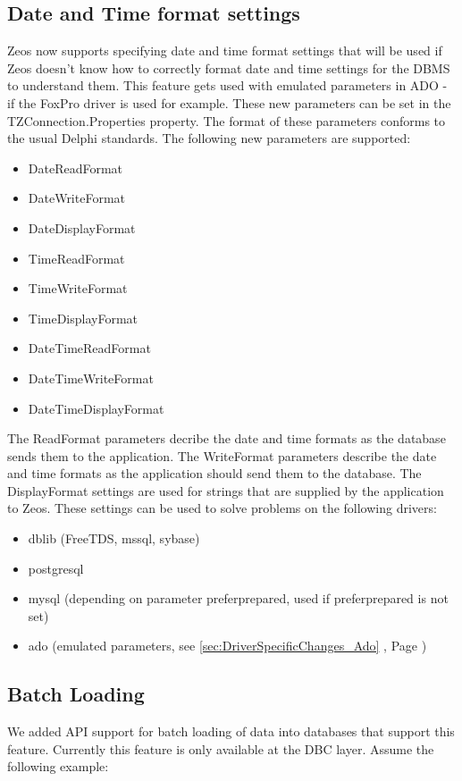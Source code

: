 \documentclass[a4paper,12pt,oneside]{article}
\begin{document}
\subsection{Date and Time format settings}
\label{sec:GeneralChanges_DateAndTimeFormatSettings}
Zeos now supports specifying date and time format settings that will be used if Zeos doesn't know how to correctly format date and time settings for the DBMS to understand them.
This feature gets used with emulated parameters in ADO - if the FoxPro driver is used for example.
These new parameters can be set in the TZConnection.Properties property.
The format of these parameters conforms to the usual Delphi standards.
The following new parameters are supported:
\begin{itemize}
\item DateReadFormat
\item DateWriteFormat
\item DateDisplayFormat
\item TimeReadFormat
\item TimeWriteFormat
\item TimeDisplayFormat
\item DateTimeReadFormat
\item DateTimeWriteFormat
\item DateTimeDisplayFormat
\end{itemize}
The ReadFormat parameters decribe the date and time formats as the data\-base sends them to the application.
The WriteFormat parameters describe the date and time formats as the application should send them to the database.
The DisplayFormat settings are used for strings that are supplied by the application to Zeos.
These settings can be used to solve problems on the following drivers:
\begin{itemize}
\item dblib (FreeTDS, mssql, sybase)
\item postgresql
\item mysql (depending on parameter preferprepared, used if preferprepared is not set)
\item ado (emulated parameters, see \ref{sec:DriverSpecificChanges_Ado} , Page \pageref{sec:DriverSpecificChanges_Ado})
\end{itemize}

\subsection{Batch Loading}
\label{sec:GeneralChanges_BatchLoading}
We added API support for batch loading of data into databases that support this feature.
Currently this feature is only available at the DBC layer.
Assume the following example:
\end{document}
